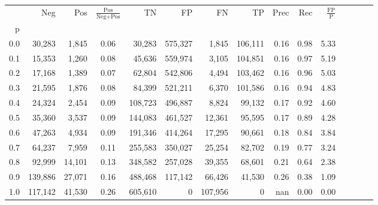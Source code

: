 \begin{tabular}{rrrcrrrrrrrrrrr}
\toprule
{} &      Neg &     Pos & $\frac{\text{Pos}}{\text{Neg}+\text{Pos}}$ &       TN &       FP &       FN &       TP &  Prec &   Rec & $\frac{\text{FP}}{\text{P}}$ \\
p   &          &         &                                            &          &          &          &          &       &       &                              \\
\midrule
0.0 &   30,283 &   1,845 &                                       0.06 &   30,283 &  575,327 &    1,845 &  106,111 &  0.16 &  0.98 &                         5.33 \\
0.1 &   15,353 &   1,260 &                                       0.08 &   45,636 &  559,974 &    3,105 &  104,851 &  0.16 &  0.97 &                         5.19 \\
0.2 &   17,168 &   1,389 &                                       0.07 &   62,804 &  542,806 &    4,494 &  103,462 &  0.16 &  0.96 &                         5.03 \\
0.3 &   21,595 &   1,876 &                                       0.08 &   84,399 &  521,211 &    6,370 &  101,586 &  0.16 &  0.94 &                         4.83 \\
0.4 &   24,324 &   2,454 &                                       0.09 &  108,723 &  496,887 &    8,824 &   99,132 &  0.17 &  0.92 &                         4.60 \\
0.5 &   35,360 &   3,537 &                                       0.09 &  144,083 &  461,527 &   12,361 &   95,595 &  0.17 &  0.89 &                         4.28 \\
0.6 &   47,263 &   4,934 &                                       0.09 &  191,346 &  414,264 &   17,295 &   90,661 &  0.18 &  0.84 &                         3.84 \\
0.7 &   64,237 &   7,959 &                                       0.11 &  255,583 &  350,027 &   25,254 &   82,702 &  0.19 &  0.77 &                         3.24 \\
0.8 &   92,999 &  14,101 &                                       0.13 &  348,582 &  257,028 &   39,355 &   68,601 &  0.21 &  0.64 &                         2.38 \\
0.9 &  139,886 &  27,071 &                                       0.16 &  488,468 &  117,142 &   66,426 &   41,530 &  0.26 &  0.38 &                         1.09 \\
1.0 &  117,142 &  41,530 &                                       0.26 &  605,610 &        0 &  107,956 &        0 &   nan &  0.00 &                         0.00 \\
\bottomrule
\end{tabular}
